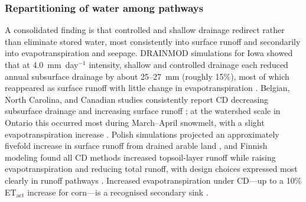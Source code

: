 \documentclass[11pt]{article}
\begin{document}
\subsubsection{Repartitioning of water among pathways}

A consolidated finding is that controlled and shallow drainage redirect rather
than eliminate stored water, most consistently into surface runoff and
secondarily into evapotranspiration and seepage. DRAINMOD simulations for Iowa
showed that at 4.0~mm~day$^{-1}$ intensity, shallow and controlled drainage each
reduced annual subsurface drainage by about 25--27~mm (roughly 15\%), most of
which reappeared as surface runoff with little change in evapotranspiration
\parencite{Singh2007b}. Belgian, North Carolina, and Canadian studies
consistently report CD decreasing subsurface drainage and increasing surface
runoff \parencite{ElSadek2002,ElSadek2002b,DEAL1986,Skaggs1995,Golmohammadi2016,Ndulue2024};
at the watershed scale in Ontario this occurred most during March--April
snowmelt, with a slight evapotranspiration increase
\parencite{Golmohammadi2016}. Polish simulations projected an approximately
fivefold increase in surface runoff from drained arable land
\parencite{Sojka2020}, and Finnish modeling found all CD methods increased
topsoil-layer runoff while raising evapotranspiration and reducing total runoff,
with design choices expressed most clearly in runoff pathways
\parencite{Isomäki2024}. Increased evapotranspiration under CD---up to a 10\%
ET$_\mathrm{act}$ increase for corn---is a recognised secondary sink
\parencite{deWit2022,DEAL1986,Ndulue2024}.
\end{document}
